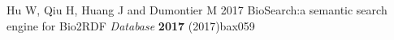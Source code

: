 \documentclass[a4paper]{jpconf}
\renewcommand{\doi}[1]{} %
\begin{document}
\begin{thebibliography}{0}
 Hu W, Qiu H, Huang J and Dumontier M 2017 BioSearch:\@ a semantic search engine for Bio2RDF \emph{Database} \textbf{2017} (2017)bax059 \doi{10.1093/database/bax059}













\end{thebibliography}
\end{document}
